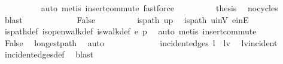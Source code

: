 \begin{isabellebody}
\ \ \ \ \ \ \ \ \isamarkupfalse%
\ {\isacharparenleft}{\kern0pt}auto{\isacharcomma}{\kern0pt}\ metis\ insert{\isacharunderscore}{\kern0pt}commute{\isacharcomma}{\kern0pt}\ fastforce{\isacharplus}{\kern0pt}{\isacharparenright}{\kern0pt}\isanewline
\ \ \ \ \ \ \isamarkupfalse%
\ \isamarkupfalse%
\ {\isacharquery}{\kern0pt}thesis\ \isamarkupfalse%
\ no{\isacharunderscore}{\kern0pt}cycles\ \isamarkupfalse%
\ blast\isanewline
\ \ \ \ \isamarkupfalse%
\isanewline
\ \ \ \ \ \ \isamarkupfalse%
\ False\isanewline
\ \ \ \ \ \ \isamarkupfalse%
\ \isamarkupfalse%
\ {\isachardoublequoteopen}is{\isacharunderscore}{\kern0pt}path\ {\isacharparenleft}{\kern0pt}u{\isacharhash}{\kern0pt}p{\isacharparenright}{\kern0pt}{\isachardoublequoteclose}\ \isamarkupfalse%
\ is{\isacharunderscore}{\kern0pt}path\ u{\isacharunderscore}{\kern0pt}in{\isacharunderscore}{\kern0pt}V\ e{\isacharunderscore}{\kern0pt}in{\isacharunderscore}{\kern0pt}E\isanewline
\ \ \ \ \ \ \ \ \isamarkupfalse%
\ is{\isacharunderscore}{\kern0pt}path{\isacharunderscore}{\kern0pt}def\ is{\isacharunderscore}{\kern0pt}open{\isacharunderscore}{\kern0pt}walk{\isacharunderscore}{\kern0pt}def\ is{\isacharunderscore}{\kern0pt}walk{\isacharunderscore}{\kern0pt}def\ e\ p\ \isamarkupfalse%
\ {\isacharparenleft}{\kern0pt}auto{\isacharcomma}{\kern0pt}\ {\isacharparenleft}{\kern0pt}metis\ insert{\isacharunderscore}{\kern0pt}commute{\isacharparenright}{\kern0pt}{\isacharplus}{\kern0pt}{\isacharparenright}{\kern0pt}\isanewline
\ \ \ \ \ \ \isamarkupfalse%
\ \isamarkupfalse%
\ False\ \isamarkupfalse%
\ longest{\isacharunderscore}{\kern0pt}path\ \isamarkupfalse%
\ auto\isanewline
\ \ \ \ \isamarkupfalse%
\isanewline
\ \ \isamarkupfalse%
\isanewline
\ \ \isamarkupfalse%
\ \isamarkupfalse%
\ {\isachardoublequoteopen}incident{\isacharunderscore}{\kern0pt}edges\ l\ {\isacharequal}{\kern0pt}\ {\isacharbraceleft}{\kern0pt}{\isacharbraceleft}{\kern0pt}l{\isacharcomma}{\kern0pt}v{\isacharbraceright}{\kern0pt}{\isacharbraceright}{\kern0pt}{\isachardoublequoteclose}\ \isamarkupfalse%
\ lv{\isacharunderscore}{\kern0pt}incident\ \isamarkupfalse%
\ incident{\isacharunderscore}{\kern0pt}edges{\isacharunderscore}{\kern0pt}def\ \isamarkupfalse%
\ blast\isanewline

\end{isabellebody}
